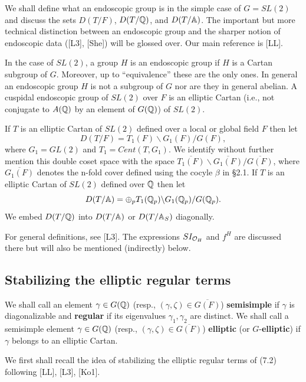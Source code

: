 We shall define what an endoscopic group is in the simple case
of $G=SL(2)$ and discuss the sets $D(T/F)$, $D(T/{\Bbb Q})$,
and $D(T/{\Bbb A})$. The important but more technical distinction
between an endoscopic group and the sharper notion of
endoscopic data ([L3], [She]) will be glossed over.
Our main reference is [LL].

In the case of $SL(2)$, a group $H$ is an endoscopic group
if $H$ is a Cartan subgroup of $G$. Moreover, up to ``equivalence''
these are the only ones. In general an endoscopic group $H$
is not a subgroup of $G$ nor are they in general abelian. A
cuspidal endoscopic group of $SL(2)$ over $F$
is an elliptic Cartan (i.e., not conjugate to $A(\mathbb{Q} )$ by an
element of $G(\mathbb{Q} )$) of $SL(2)$. 

If $T$ is an elliptic Cartan of $SL(2)$ defined over
a local or global field $F$ then let
\begin{equation}
D(T/F)=T_1(F)\backslash G_1(F)/G(F),
\end{equation}
where $G_1=GL(2)$ and $T_1=Cent(T,G_1)$.
We identify without further mention this double coset space with the
space
$\overline{T_1(F)}\backslash \overline{G_1(F)}/ \overline{G(F)}$,
where $\overline{G_1(F)}$ denotes the n-fold cover defined using the
cocyle $\beta$ in \S 2.1.
If $T$ is an elliptic Cartan of $SL(2)$ defined over
${\Bbb Q}$ then let
\begin{equation}
D(T/\mathbb{A} )
=\oplus_p T_1(\mathbb{Q} _p)\backslash G_1(\mathbb{Q} _p)/G(\mathbb{Q} _p).
\end{equation}
We embed $D(T/\mathbb{Q} )$ into $D(T/\mathbb{A} )$
or $D(T/\mathbb{A} _S)$ diagonally.

For general definitions, see [L3].
The expressions $SI_{{\cal{O}}_H}$ and $f^H$ are discussed there but
will also be mentioned (indirectly) below.

\subsection{Stabilizing the elliptic regular terms}

We shall call an element
$\gamma\in G(\mathbb{Q} )$ (resp.,
$(\gamma,\zeta) \in \overline{G(F)}$) \textbf{semisimple} if $\gamma $ is
diagonalizable and {\bf regular} if its eigenvalues
$\gamma_1,\gamma_2$ are distinct.
We shall call a semisimple element
$\gamma \in G(\mathbb{Q} )$
(resp., $(\gamma,\zeta) \in \overline{G(F)}$) \textbf{elliptic}
(or $G$-\textbf{elliptic}) if $\gamma $ belongs to
an elliptic Cartan.

We first shall recall the idea of stabilizing the elliptic regular terms of
(7.2) following [LL], [L3], [Ko1].

